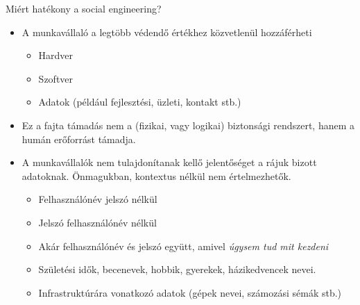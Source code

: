 \documentclass[12 pt]{beamer}
\begin{document}

\begin{frame}{Miért hatékony a social engineering?}
  \begin{itemize}
    \item{A munkavállaló a legtöbb védendő értékhez közvetlenül hozzáférheti}
      \begin{itemize}
        \item{Hardver}
        \item{Szoftver}
        \item{Adatok (például fejlesztési, üzleti, kontakt stb.)}
      \end{itemize}
    \item{Ez a fajta támadás nem a (fizikai, vagy logikai) biztonsági
      rendszert, hanem a humán erőforrást támadja.}
    \item{A munkavállalók nem tulajdonítanak kellő jelentőséget a rájuk
      bizott adatoknak. Önmagukban, kontextus nélkül nem értelmezhetők.}
      \begin{itemize}
        \item{Felhasználónév jelszó nélkül}
        \item{Jelszó felhasználónév nélkül}
        \item{Akár felhasználónév és jelszó együtt, amivel \textit{úgysem tud mit kezdeni}}
        \item{Születési idők, becenevek, hobbik, gyerekek, házikedvencek nevei.}
        \item{Infrastruktúrára vonatkozó adatok (gépek nevei, számozási sémák stb.)}
      \end{itemize}
  \end{itemize}
\end{frame}

\end{document}
